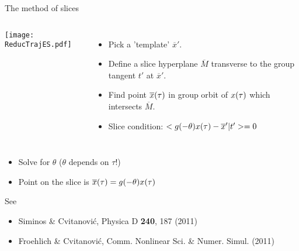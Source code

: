 \begin{frame}[t]{The method of slices}
 \begin{block}{}
  \begin{columns}
	  \texttt{[image: ReducTrajES.pdf]}
	\begin{itemize}
	  \item Pick a 'template' $\overline{x}'$.
	  \item Define a slice hyperplane $\overline{M}$ transverse to the group tangent $t'$ at $\overline{x}'$.
	  \item Find point $\overline{x}(\tau)$ in group orbit of $x(\tau)$ which intersects $\overline{M}$.
	  \item Slice condition: $<g(-\theta)x(\tau)-\overline{x}'|t'>=0$
	\end{itemize}
  \end{columns}
  \begin{itemize}
    \item Solve for $\theta$ ($\theta$ depends on $\tau$!)
    \item Point on the slice is $\overline x(\tau) = g(-\theta)x(\tau)$
  \end{itemize}
 \end{block}
  \begin{block}{See}
   \begin{itemize}
    \item {\footnotesize Siminos \& Cvitanovi\'c, Physica D {\bf 240}, 187 (2011)}
    \item {\footnotesize Froehlich \& Cvitanovi\'c, Comm. Nonlinear Sci. \& Numer. Simul.  (2011)}
   \end{itemize}

  \end{block}

\end{frame}

